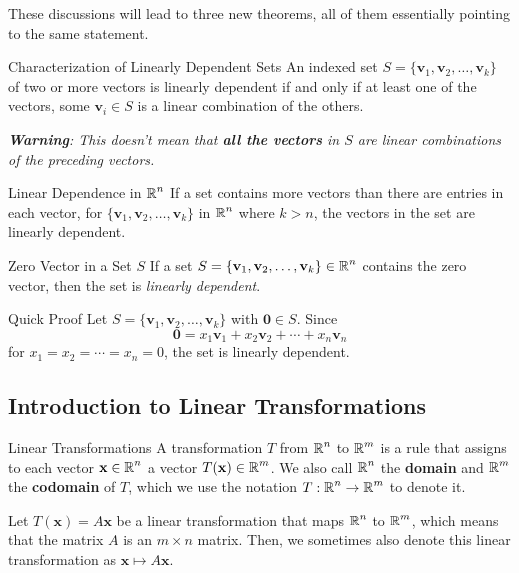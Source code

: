\documentclass{article}
\begin{document}
These discussions will lead to three new theorems, all of them essentially pointing to the same statement.

\begin{theorem}{Characterization of Linearly Dependent Sets}
	An indexed set $S = \{\mathbf{v}_1, \mathbf{v}_2, \ldots, \mathbf{v}_k\}$ of two or more vectors is linearly dependent if and only if at least one of the vectors, some $\mathbf{v}_i \in S$ is a linear combination of the others.

	\emph{\textbf{Warning}: This doesn't mean that \textbf{all the vectors} in $S$ are linear combinations of the preceding vectors.}
\end{theorem}

\begin{theorem}{Linear Dependence in $\operatorname{\mathbb{R}}^n$}
	If a set contains more vectors than there are entries in each vector, for $\{\mathbf{v}_1, \mathbf{v}_2, \ldots, \mathbf{v}_k\}$ in $\operatorname{\mathbb{R}}^n$ where $k > n$, the vectors in the set are linearly dependent.
\end{theorem}

\begin{theorem}{Zero Vector in a Set $S$}
	If a set $S = \{\mathbf{v}_1, \mathbf{v}_2, \ldots, \mathbf{v}_k\} \in \operatorname{\mathbb{R}}^n$ contains the zero vector, then the set is \emph{linearly dependent}.

	\begin{boxcontainer}{Quick Proof}
		Let $S = \{\mathbf{v}_1, \mathbf{v}_2, \ldots, \mathbf{v}_k\}$ with $\mathbf{0} \in S$. Since
		\begin{equation}
			\mathbf{0} = x_1\mathbf{v}_1 + x_2\mathbf{v}_2 + \cdots + x_n\mathbf{v}_n
		\end{equation}
		for $x_1 = x_2 = \cdots = x_n = 0$, the set is linearly dependent.
	\end{boxcontainer}
\end{theorem}

\subsection{Introduction to Linear Transformations}

\begin{definition}{Linear Transformations}
	A transformation $T$ from $\operatorname{\mathbb{R}}^n$ to $\operatorname{\mathbb{R}}^m$ is a rule that assigns to each vector $\mathbf{x} \in \operatorname{\mathbb{R}}^n$ a vector $T(\mathbf{x}) \in \operatorname{\mathbb{R}}^m$. We also call $\operatorname{\mathbb{R}}^n$ the \textbf{domain} and $\operatorname{\mathbb{R}}^m$ the \textbf{codomain} of $T$, which we use the notation $T: \operatorname{\mathbb{R}}^n \to \operatorname{\mathbb{R}}^m$ to denote it.

	Let $T(\mathbf{x}) = A\mathbf{x}$ be a linear transformation that maps $\operatorname{\mathbb{R}}^n$ to $\operatorname{\mathbb{R}}^m$, which means that the matrix $A$ is an $m \times n$ matrix. Then, we sometimes also denote this linear transformation as $\mathbf{x} \mapsto A\mathbf{x}$.
\end{definition}
\end{document}
